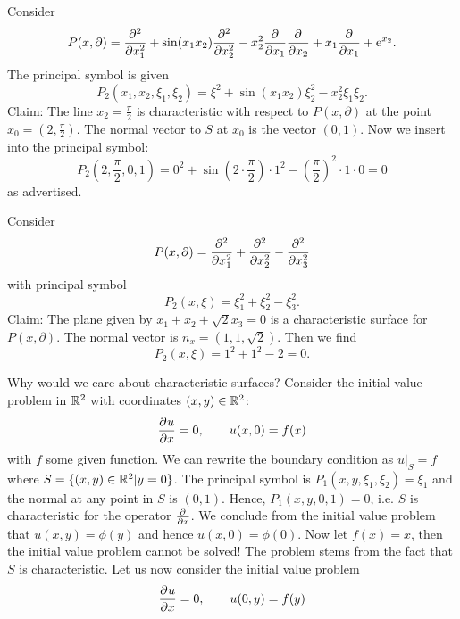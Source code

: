 \documentclass[11pt]{article}
\begin{document}
				\begin{eg}
					Consider
					\begin{equation*}
						P(x,\partial)=\del[2]{}{x_1^2}+\sin(x_1x_2)\del[2]{}{x_2^2}-x_2^2\del[]{}{x_1}\del[]{}{x_2}+x_1\del[]{}{x_1}+\e{x_2}.	
					\end{equation*}
					The principal symbol is given
					\begin{equation*}
						P_2(x_1,x_2,\xi_1,\xi_2)=\xi^2+\sin(x_1x_2)\xi_2^2-x_2^2\xi_1\xi_2.
					\end{equation*}
					Claim: The line $x_2=\frac{\pi}{2}$ is characteristic with respect to $P(x,\partial)$ at the point $x_0=(2,\frac{\pi}{2})$. The normal vector to $S$ at $x_0$ is the vector $(0,1)$. Now we insert into the principal symbol:
					\begin{equation*}
						P_2(2,\frac{\pi}{2},0,1)=0^2+\sin(2\cdot\frac{\pi}{2})\cdot1^2-(\frac{\pi}{2})^2\cdot1\cdot0=0
					\end{equation*}
					as advertised.
				\end{eg}

				\begin{eg}
					Consider
					\begin{equation*}
						P(x,\partial)=\del[2]{}{x_1^2}+\del[2]{}{x_2^2}-\del[2]{}{x_3^2}
					\end{equation*}
					with principal symbol
					\begin{equation*}
						P_2(x,\xi)=\xi_1^2+\xi_2^2-\xi_3^2.
					\end{equation*}
					Claim: The plane given by $x_1+x_2+\sqrt{2}x_3=0$ is a characteristic surface for $P(x,\partial)$. The normal vector is $n_x=(1,1,\sqrt{2})$. Then we find
					\begin{equation*}
						P_2(x,\xi)=1^2+1^2-2=0.
					\end{equation*}
				\end{eg}

				Why would we care about characteristic surfaces? Consider the initial value problem in $\R^2$ with coordinates $(x,y)\in\R^2$:
				\begin{equation*}
					\del[]{u}{x}=0,\qquad u(x,0)=f(x)
				\end{equation*}
				with $f$ some given function. We can rewrite the boundary condition as $u|_S=f$ where $S=\{(x,y)\in\R^2|y=0\}$. The principal symbol is
				$P_1(x,y,\xi_1,\xi_2)=\xi_1$ and the normal at any point in $S$ is $(0,1)$. Hence, $P_1(x,y,0,1)=0$, i.e. $S$ is characteristic for the operator $\del[]{}{x}$. We conclude from the initial value problem that $u(x,y)=\phi(y)$ and hence $u(x,0)=\phi(0)$. Now let $f(x)=x$, then the initial value problem cannot be solved! The problem stems from the fact that $S$ is characteristic.
				Let us now consider the initial value problem
					\begin{equation*}
					\del[]{u}{x}=0,\qquad u(0,y)=f(y)
				\end{equation*}
				
\end{document}
